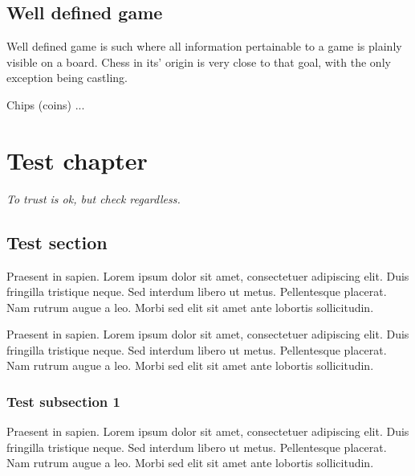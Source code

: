 \documentclass[a5paper,12pt,draft]{book} %
\begin{document}
\section*{Well defined game}

Well defined game is such where all information pertainable to a game
is plainly visible on a board. Chess in its' origin is very close to
that goal, with the only exception being castling.

Chips (coins) ...

\clearpage

\chapter*{Test chapter}

\begin{flushright}
\parbox{0.6\textwidth}{
\emph{To trust is ok, but check regardless. \\
 } }
\end{flushright}

\section*{Test section}

Praesent in sapien. Lorem ipsum dolor sit amet, consectetuer adipiscing elit.
Duis fringilla tristique neque. Sed interdum libero ut metus. Pellentesque placerat.
Nam rutrum augue a leo. Morbi sed elit sit amet ante lobortis sollicitudin.

Praesent in sapien. Lorem ipsum dolor sit amet, consectetuer adipiscing elit.
Duis fringilla tristique neque. Sed interdum libero ut metus. Pellentesque placerat.
Nam rutrum augue a leo. Morbi sed elit sit amet ante lobortis sollicitudin.

\subsection*{Test subsection 1}
Praesent in sapien. Lorem ipsum dolor sit amet, consectetuer adipiscing elit.
Duis fringilla tristique neque. Sed interdum libero ut metus. Pellentesque placerat.
Nam rutrum augue a leo. Morbi sed elit sit amet ante lobortis sollicitudin.
\end{document}
